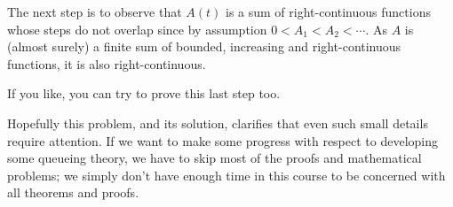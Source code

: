 \begin{extra}
\begin{solution}
 The next step is to observe that $A(t)$ is a sum of right-continuous functions whose steps do not overlap since by assumption $0<A_1 < A_2 < \cdots$.
 As $A$ is (almost surely) a finite sum of bounded, increasing and right-continuous functions, it is also right-continuous.

 If you like, you can try to prove this last step too. 

 Hopefully this problem, and its solution, clarifies that even such small details require attention.
 If we want to make some progress with respect to developing some queueing theory, we have to skip most of the proofs and mathematical problems; we simply don't have enough time in this course to be concerned with all theorems and proofs.

\end{solution}
\end{extra}



